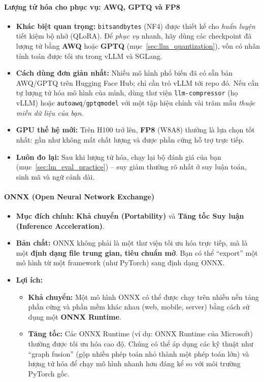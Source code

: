 \paragraph{Lượng tử hóa cho phục vụ: AWQ, GPTQ và FP8 \newtag}
\begin{itemize}
	\item \textbf{Khác biệt quan trọng:} \texttt{bitsandbytes} (NF4) được thiết kế cho \emph{huấn luyện} tiết kiệm bộ nhớ (QLoRA). Để \emph{phục vụ} nhanh, hãy dùng các checkpoint đã lượng tử bằng \textbf{AWQ} hoặc \textbf{GPTQ} (mục~\ref{sec:llm_quantization}), vốn có nhân tính toán được tối ưu trong vLLM và SGLang.
	\item \textbf{Cách dùng đơn giản nhất:} Nhiều mô hình phổ biến đã có sẵn bản AWQ/GPTQ trên Hugging Face Hub; chỉ cần trỏ vLLM tới repo đó. Nếu cần tự lượng tử hóa mô hình của mình, dùng thư viện \texttt{llm-compressor} (họ vLLM) hoặc \texttt{autoawq}/\texttt{gptqmodel} với một tập hiệu chỉnh vài trăm mẫu \emph{thuộc miền dữ liệu của bạn}.
	\item \textbf{GPU thế hệ mới:} Trên H100 trở lên, \textbf{FP8} (W8A8) thường là lựa chọn tốt nhất: gần như không mất chất lượng và được phần cứng hỗ trợ trực tiếp.
	\item \textbf{Luôn đo lại:} Sau khi lượng tử hóa, chạy lại bộ đánh giá của bạn (mục~\ref{sec:lm_eval_practice}) -- suy giảm thường rõ nhất ở suy luận toán, sinh mã và ngữ cảnh dài.
\end{itemize}

\paragraph{ONNX (Open Neural Network Exchange)}
\begin{itemize}
    \item \textbf{Mục đích chính:} \textbf{Khả chuyển (Portability)} và \textbf{Tăng tốc Suy luận (Inference Acceleration)}.
    \item \textbf{Bản chất:} ONNX không phải là một thư viện tối ưu hóa trực tiếp, mà là một \textbf{định dạng file trung gian, tiêu chuẩn mở}. Bạn có thể “export” một mô hình từ một framework (như PyTorch) sang định dạng ONNX.
    \item \textbf{Lợi ích:}
        \begin{itemize}
            \item \textbf{Khả chuyển:} Một mô hình ONNX có thể được chạy trên nhiều nền tảng phần cứng và phần mềm khác nhau (web, mobile, server) bằng cách sử dụng một \textbf{ONNX Runtime}.
            \item \textbf{Tăng tốc:} Các ONNX Runtime (ví dụ: ONNX Runtime của Microsoft) thường được tối ưu hóa cao độ. Chúng có thể áp dụng các kỹ thuật như “graph fusion” (gộp nhiều phép toán nhỏ thành một phép toán lớn) và lượng tử hóa để chạy mô hình nhanh hơn đáng kể so với môi trường PyTorch gốc.
        \end{itemize}
\end{itemize}